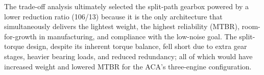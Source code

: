 		The trade-off analysis ultimately selected the split-path gearbox powered by a lower reduction ratio (106/13) because it is the 
		only architecture that simultaneously delivers the lightest weight, the highest reliability (MTBR), room-for-growth in manufacturing, 
		and compliance with the low-noise goal. The split-torque design, despite its inherent torque balance, fell short due to extra gear 
		stages, heavier bearing loads, and reduced redundancy; all of which would have increased weight and lowered MTBR for the ACA's 
		three-engine configuration. 